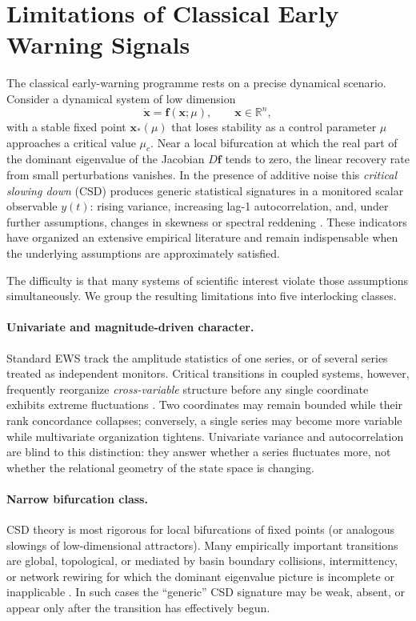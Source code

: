 \documentclass[11pt,a4paper]{article}
\begin{document}
\section{Limitations of Classical Early Warning Signals}
\label{sec:limitations}


The classical early-warning programme rests on a precise dynamical
scenario. Consider a dynamical system of low dimension
\begin{equation}
\label{eq:csd_flow}
\dot{\mathbf{x}} = \mathbf{f}(\mathbf{x};\mu),\qquad
\mathbf{x}\in\mathbb{R}^{n},
\end{equation}
with a stable fixed point $\mathbf{x}_*(\mu)$ that loses stability as a
control parameter $\mu$ approaches a critical value $\mu_c$. Near a
local bifurcation at which the real part of the dominant eigenvalue of
the Jacobian $D\mathbf{f}$ tends to zero, the linear recovery rate from
small perturbations vanishes. In the presence of additive noise this
\emph{critical slowing down} (CSD) produces generic statistical
signatures in a monitored scalar observable $y(t)$: rising variance,
increasing lag-1 autocorrelation, and, under further assumptions, changes
in skewness or spectral reddening
\cite{Scheffer2009,Dakos2012,Kuehn2011}. These indicators have organized
an extensive empirical literature and remain indispensable when the
underlying assumptions are approximately satisfied.

The difficulty is that many systems of scientific interest violate those
assumptions simultaneously. We group the resulting limitations into five
interlocking classes.

\paragraph{Univariate and magnitude-driven character.}
Standard EWS track the amplitude statistics of one series, or of several
series treated as independent monitors. Critical transitions in coupled
systems, however, frequently reorganize \emph{cross-variable} structure
before any single coordinate exhibits extreme fluctuations
\cite{Dakos2015,Boettiger2013}. Two coordinates may remain bounded while
their rank concordance collapses; conversely, a single series may become
more variable while multivariate organization tightens. Univariate
variance and autocorrelation are blind to this distinction: they answer
whether a series fluctuates more, not whether the relational geometry of
the state space is changing.

\paragraph{Narrow bifurcation class.}
CSD theory is most rigorous for local bifurcations of fixed points (or
analogous slowings of low-dimensional attractors). Many empirically
important transitions are global, topological, or mediated by basin
boundary collisions, intermittency, or network rewiring for which the
dominant eigenvalue picture is incomplete or inapplicable
\cite{Kuehn2011,Ditlevsen2010}. In such cases the ``generic'' CSD
signature may be weak, absent, or appear only after the transition has
effectively begun.
\end{document}
